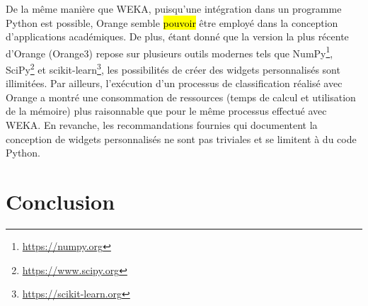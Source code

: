 De la même manière que WEKA, puisqu'une intégration dans un programme Python est possible, Orange semble \hl{pouvoir} être employé dans la conception d'applications académiques. De plus, étant donné que la version la plus récente d'Orange (Orange3) repose sur plusieurs outils modernes tels que NumPy\footnote{\url{https://numpy.org}}, SciPy\footnote{\url{https://www.scipy.org}} et scikit-learn\footnote{\url{https://scikit-learn.org}}, les possibilités de créer des widgets personnalisés sont illimitées. Par ailleurs, l'exécution d'un processus de classification réalisé avec Orange a montré une consommation de ressources (temps de calcul et utilisation de la mémoire) plus raisonnable que pour le même processus effectué avec \acs{WEKA}. En revanche, les recommandations fournies qui documentent la conception de widgets personnalisés ne sont pas triviales et se limitent à du code Python.

\section{Conclusion}

